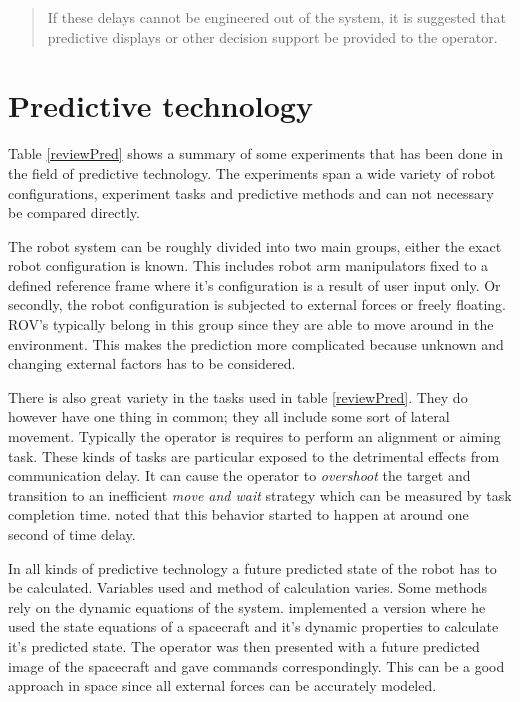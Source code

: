 \begin{quote}
\small If these delays cannot be engineered out of the system, it is suggested that predictive displays or other decision support be provided to the operator.
\end{quote}


\section{Predictive technology}



Table \ref{reviewPred} shows a summary of some experiments that has been done in the field of predictive technology. The experiments span a wide variety of robot configurations, experiment tasks and predictive methods and can not necessary be compared directly.


The robot system can be roughly divided into two main groups, either the exact robot configuration is known. This includes robot arm manipulators fixed to a defined reference frame where it's configuration is a result of user input only. Or secondly, the robot configuration is subjected to external forces or freely floating. ROV's typically belong in this group since they are able to move around in the environment. This makes the prediction more complicated because unknown and changing external factors has to be considered.

There is also great variety in the tasks used in table \ref{reviewPred}. They do however have one thing in common; they all include some sort of lateral movement. Typically the operator is requires to perform an alignment or aiming task. These kinds of tasks are particular exposed to the detrimental effects from communication delay. It can cause the operator to \emph{overshoot} the target and transition to an inefficient \emph{move and wait} strategy which can be measured by task completion time. \citet{Lane2002} noted that this behavior started to happen at around one second of time delay.

In all kinds of predictive technology a future predicted state of the robot has to be calculated. Variables used and method of calculation varies. Some methods rely on the dynamic equations of the system. \citet{Zhang2017} implemented a version where he used the state equations of a spacecraft and it's dynamic properties to calculate it's predicted state. The operator was then presented with a future predicted image of the spacecraft and gave commands correspondingly. This can be a good approach in space since all external forces can be accurately modeled.


